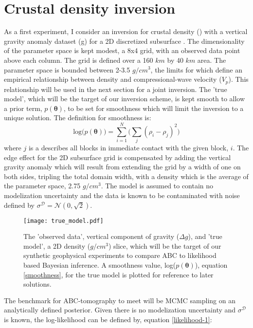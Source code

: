 \section{Crustal density inversion}

As a first experiment, I consider an inversion for crustal density (\rho) with a vertical gravity anomaly dataset (\Delta g) for a 2D discretized subsurface \citep[p.184-195,378]{blakely1996}. The dimensionality of the parameter space is kept modest, a 8x4 grid, with an observed data point above each column. The grid is defined over a 160 $km$ by 40 $km$ area. The parameter space is bounded between 2-3.5 $g/cm^3$, the limits for which \citet{Brocher2005} define an empirical relationship between density and compressional-wave velocity ($V_p$). This relationship will be used in the next section for a joint inversion. The 'true model', which will be the target of our inversion scheme, is kept smooth to allow a prior term, $p(\bm{\theta})$, to be set for smoothness which will limit the inversion to a unique solution. The definition for smoothness is:
\begin{equation}
\text{log}\big(p(\bm{\theta})\big) = \sum_{i = 1}^{N} \Big(\sum_{j} (\rho_i - \rho_j)^2\Big)
\label{smoothness}
\end{equation}
where $j$ is a describes all blocks in immediate contact with the given block, $i$. The edge effect for the 2D subsurface grid is compensated by adding the vertical gravity anomaly which will result from extending the grid by a width of one on both sides, tripling the total domain width, with a density which is the average of the parameter space, 2.75 $g/cm^3$. The model is assumed to contain no modelization uncertainty and the data is known to be contaminated with noise defined by $\sigma^{\mathcal{D}} = \mathcal{N}(0,\sqrt{2})$.
\begin{figure}[H]
	\centering
	\texttt{[image: true\_model.pdf]}
	\caption{The 'observed data', vertical component of gravity ($\Delta g$), and 'true model', a 2D density ($g/cm^3$) slice, which will be the target of our synthetic geophysical experiments to compare ABC to likelihood based Bayesian inference. A smoothness value, log($p(\bm{\theta})$), equation \ref{smoothness}, for the true model is plotted for reference to later solutions.}
\end{figure}
The benchmark for ABC-tomography to meet will be MCMC sampling on an analytically defined posterior. Given there is no modelization uncertainty and $\sigma^{\mathcal{D}}$ is known, the log-likelihood can be defined by, equation \ref{likelihood-1}:
